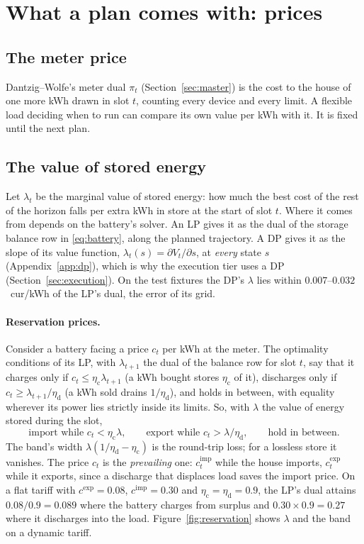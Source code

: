 \documentclass[11pt,a4paper]{article}
\newcommand{\Ec}{\eta_{\mathrm c}}
\newcommand{\Ed}{\eta_{\mathrm d}}
\newcommand{\cimp}{c^{\mathrm{imp}}}
\newcommand{\cexp}{c^{\mathrm{exp}}}
\begin{document}
\section{What a plan comes with: prices}
\label{sec:prices}

\subsection{The meter price}

Dantzig--Wolfe's meter dual $\pi_t$ (Section~\ref{sec:master}) is the cost to the
house of one more kWh drawn in slot $t$, counting every device and every limit.
A flexible load deciding when to run can compare its own value per kWh with it.
It is fixed until the next plan.

\subsection{The value of stored energy}
\label{sec:lambda}

Let $\lambda_t$ be the marginal value of stored energy: how much the best cost of
the rest of the horizon falls per extra kWh in store at the start of slot $t$.
Where it comes from depends on the battery's solver. An LP gives it as the dual
of the storage balance row in \eqref{eq:battery}, along the planned trajectory.
A DP gives it as the slope of its value function, $\lambda_t(s) = \partial
V_t/\partial s$, at \emph{every} state $s$ (Appendix~\ref{app:dp}), which is why
the execution tier uses a DP (Section~\ref{sec:execution}). On the test fixtures
the DP's $\lambda$ lies within $0.007$--$0.032$~cur/kWh of the LP's dual, the
error of its grid.

\paragraph{Reservation prices.} Consider a battery facing a price $c_t$ per kWh
at the meter. The optimality conditions of its LP, with $\lambda_{t+1}$ the dual
of the balance row for slot $t$, say that it charges only if $c_t \le
\Ec\lambda_{t+1}$ (a kWh bought stores $\Ec$ of it), discharges only if $c_t \ge
\lambda_{t+1}/\Ed$ (a kWh sold drains $1/\Ed$), and holds in between, with
equality wherever its power lies strictly inside its limits. So, with
$\lambda$ the value of energy stored during the slot,
\begin{equation}
  \text{import while } c_t < \Ec\lambda, \qquad
  \text{export while } c_t > \lambda/\Ed, \qquad
  \text{hold in between.}
  \label{eq:reservation}
\end{equation}
The band's width $\lambda(1/\Ed - \Ec)$ is the round-trip loss; for a lossless
store it vanishes. The price $c_t$ is the \emph{prevailing} one: $\cimp_t$ while
the house imports, $\cexp_t$ while it exports, since a discharge that displaces
load saves the import price. On a flat tariff with $\cexp = 0.08$, $\cimp =
0.30$ and $\Ec = \Ed = 0.9$, the LP's dual attains $0.08/0.9 = 0.089$ where the
battery charges from surplus and $0.30 \times 0.9 = 0.27$ where it discharges
into the load. Figure~\ref{fig:reservation} shows $\lambda$ and the band on a
dynamic tariff.
\end{document}
